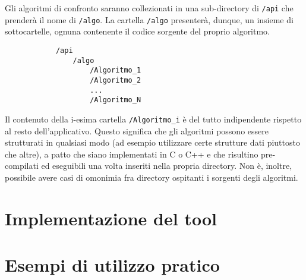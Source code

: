         \vspace{3mm}
        
        Gli algoritmi di confronto saranno collezionati in una sub-directory di \verb|/api| che prenderà il nome di \verb|/algo|. La cartella \verb|/algo| presenterà, dunque, un insieme di sottocartelle, ognuna contenente il codice sorgente del proprio algoritmo.
        
       \begin{verbatim} 
            /api         
                /algo
                    /Algoritmo_1
                    /Algoritmo_2
                    ...
                    /Algoritmo_N
        \end{verbatim}
        
        Il contenuto della i-esima cartella \verb|/Algoritmo_i| è del tutto indipendente rispetto al resto dell'applicativo. Questo significa che gli algoritmi possono essere strutturati in qualsiasi modo (ad esempio utilizzare certe strutture dati piuttosto che altre), a patto che siano implementati in C o C++ e che risultino pre-compilati ed eseguibili una volta inseriti nella propria directory. Non è, inoltre, possibile avere casi di omonimia fra directory ospitanti i sorgenti degli algoritmi.
        
\section{Implementazione del tool}

\section{Esempi di utilizzo pratico}